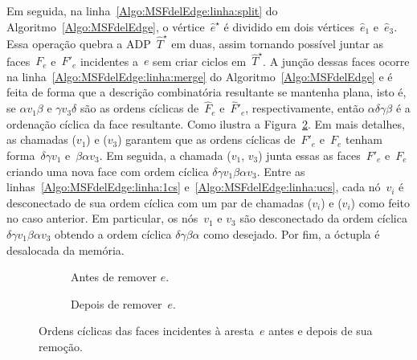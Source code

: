 Em seguida, na linha~\ref{Algo:MSFdelEdge:linha:split} do Algoritmo~\ref{Algo:MSFdelEdge}, o vértice~$\hat e^\star$ é dividido em dois vértices~$\hat e_1$ e~$\hat e_3$. 
Essa operação quebra a ADP~$\hat T^\star$ em duas, assim tornando possível juntar as faces~$F_e$ e~$F'_e$ incidentes a~$e$ sem criar ciclos em~$\hat T^\star$.
A junção dessas faces ocorre na linha~\ref{Algo:MSFdelEdge:linha:merge} do Algoritmo~\ref{Algo:MSFdelEdge} e é feita de forma que a descrição combinatória resultante se mantenha plana, isto é, se $\alpha v_1 \beta$ e $\gamma v_3 \delta$ são as ordens cíclicas de~$\hat F_e$ e~$\hat F'_e$, respectivamente, então $\alpha \delta\gamma\beta$ é a ordenação cíclica da face resultante.
Como ilustra a Figura~\ref{fig:MSF-ordem-ciclica-nao-ponte}.
Em mais detalhes, as chamadas \LCOCycle($v_1$) e \LCOCycle($v_3$) garantem que as ordens cíclicas de~$F'_e$ e~$F_e$ tenham forma~$\delta\gamma v_1$ e~$\beta\alpha v_3$.
Em seguida, a chamada \LCOMerge($v_1$, $v_3$) junta essas as faces~$F'_e$ e~$F_e$ criando uma nova face com ordem cíclica $\delta\gamma v_1\beta\alpha v_3$.
Entre as linhas~\ref{Algo:MSFdelEdge:linha:1cs} e~\ref{Algo:MSFdelEdge:linha:ucs}, cada nó~$v_i$ é desconectado de sua ordem cíclica com um par de chamadas \LCOCycle($v_i$) e \LCOSplit($v_i$) como feito no caso anterior.
Em particular, os nós~$v_1$ e $v_3$ são desconectado da ordem cíclica $\delta\gamma v_1\beta\alpha v_3$ obtendo a ordem cíclica $\delta\gamma\beta\alpha$ como desejado.
Por fim, a óctupla é desalocada da memória.


\begin{figure}[h!]
\begin{subfigure}{.4\textwidth}

\caption{Antes de remover $e$.}
\end{subfigure}
\hfill
\begin{subfigure}{.4\textwidth}

\caption{Depois de remover~$e$.}
\label{fig:MSF-ordem-ciclica-nao-ponte-depois}
\end{subfigure}
\caption{Ordens cíclicas das faces incidentes à aresta~$e$ antes e depois de sua remoção.}
\label{fig:MSF-ordem-ciclica-nao-ponte}
\end{figure}

